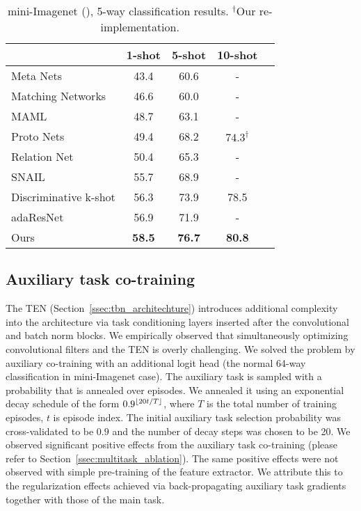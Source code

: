 \documentclass{article}
\DeclarePairedDelimiter\floor{\lfloor}{\rfloor}
\begin{document}
\begin{table}[t!]
\centering
\label{table:key_results}
\caption{mini-Imagenet (\citet{vinyals2016matching}), 5-way classification results. $^\dagger$Our re-implementation.}
\label{table:sota}
\begin{tabular}{@{}lccc@{}r}
\toprule
\multicolumn{1}{c}{} &  \multicolumn{1}{c}{1-shot} & \multicolumn{1}{c}{5-shot} & \multicolumn{1}{c}{10-shot} \\ \midrule 
Meta Nets \citep{ravi2016optimization} & 43.4 & 60.6 & -  \\
Matching Networks \citep{vinyals2016matching} & 46.6 & 60.0 & - \\
MAML \citep{finn2017model} & 48.7 & 63.1 & -  \\
Proto Nets \citep{snell2017prototypical} & 49.4 & 68.2 & $74.3^{\dagger}$  \\
Relation Net \citep{sung2018learning} & 50.4 & 65.3 & - \\ 
SNAIL \citep{mishra2018simle} & 55.7 & 68.9 & - \\ 
Discriminative k-shot \citep{Bauer2017discriminative} & 56.3 & 73.9 & 78.5 \\ 
adaResNet \citep{munkhdalai2018rapid} & 56.9 & 71.9 & - \\ \midrule
Ours & \textbf{58.5} & \textbf{76.7} &  \textbf{80.8} \\ \bottomrule
\end{tabular} 
\end{table}

\subsection{Auxiliary task co-training} \label{ssec:theory_multitask}

The TEN (Section~\ref{ssec:tbn_architechture}) introduces additional complexity into the architecture via task conditioning layers inserted after the convolutional and batch norm blocks. We empirically observed that simultaneously optimizing convolutional filters and the TEN is overly challenging. We solved the problem by auxiliary co-training with an additional logit head (the normal 64-way classification in mini-Imagenet case). The auxiliary task is sampled with a probability that is annealed over episodes. We annealed it using an exponential decay schedule of the form $0.9^{\floor{20t/T}}$, where $T$ is the total number of training episodes, $t$ is episode index. The initial auxiliary task selection probability was cross-validated to be $0.9$ and the number of decay steps was chosen to be 20. We observed significant positive effects from the auxiliary task co-training (please refer to Section~\ref{ssec:multitask_ablation}). The same positive effects were not observed with simple pre-training of the feature extractor. We attribute this to the regularization effects achieved via back-propagating auxiliary task gradients together with those of the main task.
\end{document}
